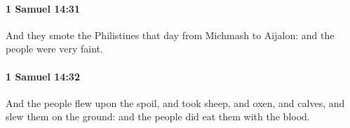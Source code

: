 		\paragraph{1 Samuel 14:31} %
			\label{1SAMUEL-14-31}

			And they smote the Philistines that day from Michmash to Aijalon: and the people were very faint.


		\paragraph{1 Samuel 14:32} %
			\label{1SAMUEL-14-32}

			And the people flew upon the spoil, and took sheep, and oxen, and calves, and slew them on the ground: and the people did eat them with the blood.


